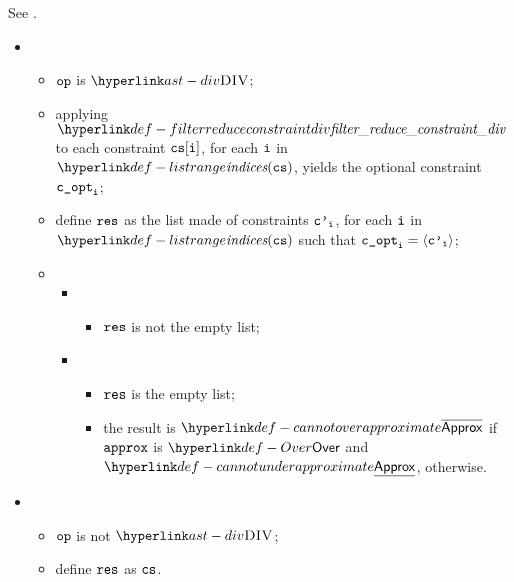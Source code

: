 See .

\ProseParagraph
\OneApplies
\begin{itemize}
  \item \AllApply
  \begin{itemize}
    \item $\op$ is $\DIV$;
    \item applying $\filterreduceconstraintdiv$ to each constraint $\cs[\vi]$, for each $\vi$ in $\listrange(\cs)$,
          yields the optional constraint $\vcopt_\vi$\ProseOrTypeError;
    \item define $\vres$ as the list made of constraints $\vcp_\vi$, for each $\vi$ in $\listrange(\cs)$
          such that $\vcopt_\vi = \langle\vcp_\vi\rangle$;
    \item \OneApplies
    \begin{itemize}
      \item {}
      \begin{itemize}
        \item $\vres$ is not the empty list;
      \end{itemize}

      \item {}
      \begin{itemize}
        \item $\vres$ is the empty list;
        \item the result is $\CannotOverapproximate$ if $\vapprox$ is $\Over$ and $\CannotUnderapproximate$, otherwise.
      \end{itemize}
    \end{itemize}
  \end{itemize}

  \item {}
  \begin{itemize}
    \item $\op$ is not $\DIV$;
    \item define $\vres$ as $\cs$.
  \end{itemize}
\end{itemize}

\FormallyParagraph
\begin{mathpar}
\end{mathpar}

